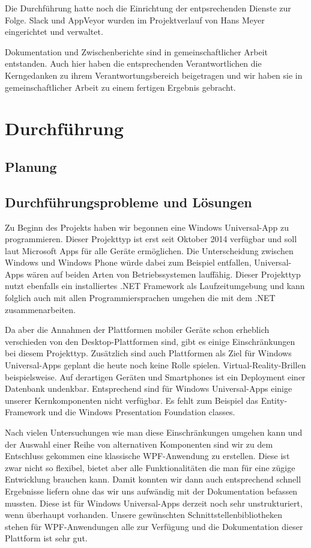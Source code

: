 \documentclass[12pt]{article}
\begin{document}
Die Durchführung hatte noch die Einrichtung der entpsrechenden Dienste zur Folge. Slack und AppVeyor wurden im Projektverlauf von Hans Meyer eingerichtet und verwaltet. 
\newline

Dokumentation und Zwischenberichte sind in gemeinschaftlicher Arbeit entstanden. Auch hier haben die entsprechenden Verantwortlichen die Kerngedanken zu ihrem Verantwortungsbereich beigetragen und wir haben sie in gemeinschaftlicher Arbeit zu einem fertigen Ergebnis gebracht.
\newline

\newpage
\section{Durchführung}
\subsection{Planung}
\subsection{Durchführungsprobleme und Lösungen}

Zu Beginn des Projekts haben wir begonnen eine Windows Universal-App zu programmieren. Dieser Projekttyp ist erst seit Oktober 2014 verfügbar und soll laut Microsoft Apps für alle Geräte ermöglichen. Die Unterscheidung zwischen Windows und Windows Phone würde dabei zum Beispiel entfallen, Universal-Apps wären auf beiden Arten von Betriebssystemen lauffähig. Dieser Projekttyp nutzt ebenfalls ein installiertes .NET Framework als Laufzeitumgebung und kann folglich auch mit allen Programmiersprachen umgehen die mit dem .NET zusammenarbeiten.
\newline

Da aber die Annahmen der Plattformen mobiler Geräte schon erheblich verschieden von den Desktop-Plattformen sind, gibt es einige Einschränkungen bei diesem Projekttyp. Zusätzlich sind auch Plattformen als Ziel für Windows Universal-Apps geplant die heute noch keine Rolle spielen. Virtual-Reality-Brillen beispielsweise. Auf derartigen Geräten und Smartphones ist ein Deployment einer Datenbank undenkbar. Entsprechend sind für Windows Universal-Apps einige unserer Kernkomponenten nicht verfügbar. Es fehlt zum Beispiel das Entity-Framework und die Windows Presentation Foundation classes.
\newline

Nach vielen Untersuchungen wie man diese Einschränkungen umgehen kann und der Auswahl einer Reihe von alternativen Komponenten sind wir zu dem Entschluss gekommen eine klassische WPF-Anwendung zu erstellen. Diese ist zwar nicht so flexibel, bietet aber alle Funktionalitäten die man für eine zügige Entwicklung brauchen kann. Damit konnten wir dann auch entsprechend schnell Ergebnisse liefern ohne das wir uns aufwändig mit der Dokumentation befassen mussten. Diese ist für Windows Universal-Apps derzeit noch sehr unstrukturiert, wenn überhaupt vorhanden. Unsere gewünschten Schnittstellenbibliotheken stehen für WPF-Anwendungen alle zur Verfügung und die Dokumentation dieser Plattform ist sehr gut.
\end{document}
